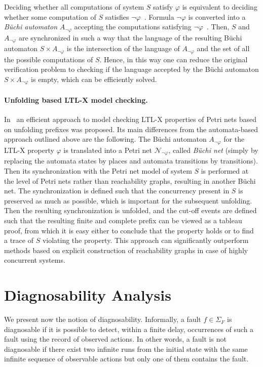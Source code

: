\documentclass[a4paper]{article}
\newcommand{\buchi}                {\mbox{B\"uchi}\xspace}
\newcommand{\A}[1][\neg\varphi]    {\mbox{$A_{#1}$}\xspace}
\newcommand{\N}[1][\neg\varphi]    {\mbox{$\netn_{#1}$}\xspace}
\newcommand\netn{{\mathcal{N}}}
\begin{document}
Deciding whether all computations of system $S$ satisfy $\varphi$ is equivalent to deciding whether some computation of $S$ satisfies $\neg\varphi$~\cite{VW-86}. Formula $\neg\varphi$ is converted into a \emph{\buchi automaton} $A_{\neg\varphi}$ accepting the computations satisfying $\neg\varphi$~\cite{GO-01}. Then, $S$ and $\A$ are synchronized in such a way that the language of the resulting \buchi automaton $S\times\A$ is the intersection of the language of $\A$ and the set of all the possible computations of $S$. Hence, in this way one can reduce the original verification problem to checking if the language accepted by the \buchi automaton $S\times\A$ is empty, which can be efficiently solved.

\paragraph{Unfolding based LTL-X model checking.}

In~\cite{EH-01} an efficient approach to model checking LTL-X properties of Petri nets based on unfolding prefixes was proposed. Its main differences from the automata-based approach outlined above are the following. The \buchi automaton $\A$ for the LTL-X property $\varphi$ is translated into a Petri net $\N$, called \emph{\buchi net} (simply by replacing the automata states by places and automata transitions by transitions). Then its synchronization with the Petri net model of system $S$ is performed at the level of Petri nets rather than reachability graphs, resulting in another \buchi net. The synchronization is defined such that the concurrency present in $S$ is preserved as much as possible, which is important for the subsequent unfolding. Then the resulting synchronization is unfolded, and
the cut-off events are defined such that the resulting finite and complete prefix can be viewed as a tableau proof, from which it is easy either to conclude that the property holds or to find a trace of $S$ violating the property. This approach can significantly outperform methods based on explicit construction of reachability graphs in case of highly concurrent systems.

\section{Diagnosability Analysis} \label{sec:diag}

We present now the notion of diagnosability. Informally, a fault $f \in \Sigma_F$ is diagnosable if it is possible to detect, within a finite delay, occurrences of such a fault using the record of observed actions. In other words, a fault is not diagnosable if there exist two infinite runs from the initial state with the same infinite sequence of observable actions but only one of them contains the fault.
\end{document}
